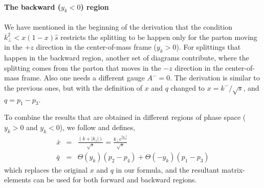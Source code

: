 \begin{appendices}
\paragraph{The backward ($y_k < 0$) region}
We have mentioned in the beginning of the derivation that the condition $k_\perp^2 < x(1-x)\hat{s}$ restricts the splitting to be happen only for the parton moving in the $+z$ direction in the center-of-mass frame ($y_k > 0$).
For splittings that happen in the backward region, another set of diagrams contribute, where the splitting comes from the parton that moves in the $-z$ direction in the center-of-mass frame.
Also one needs a different gauge $A^- = 0$.
The derivation is similar to the previous ones, but with the definition of $x$ and $q$ changed to $x = k^-/\sqrt{s}$, and $q = p_1-p_3$.

To combine the results that are obtained in different regions of phase space ($y_k > 0$ and $y_k < 0$), we follow \cite{Fochler:2013epa} and defines,
\begin{eqnarray}
\bar{x} &=& \frac{(k + |k_z|)}{\sqrt{s}} = \frac{k_\perp e^{|y_k|}}{\sqrt{s}}\\ 
\bar{q} &=& \Theta(y_k)(p_2-p_4) + \Theta(-y_k)(p_1-p_3)
\end{eqnarray}
which replaces the original $x$ and $q$ in our formula, and the resultant matrix-elements can be used for both forward and backward regions.




\end{appendices}
